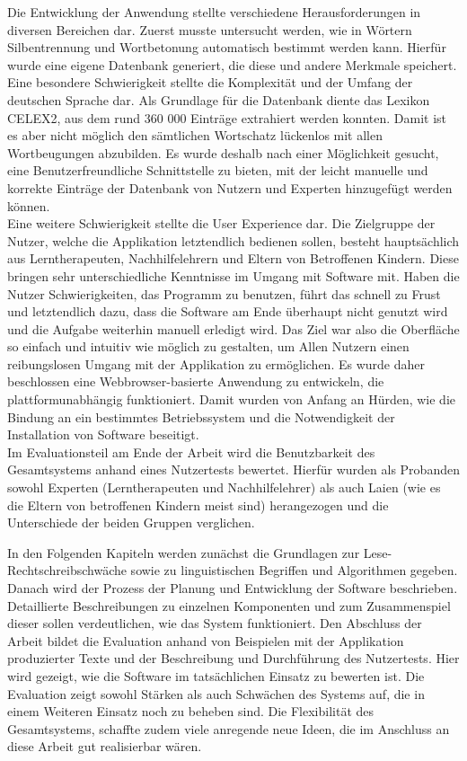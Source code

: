Die Entwicklung der Anwendung stellte verschiedene Herausforderungen in diversen Bereichen dar. Zuerst musste untersucht werden, wie in Wörtern Silbentrennung und Wortbetonung automatisch bestimmt werden kann. Hierfür wurde eine eigene Datenbank generiert, die diese und andere Merkmale speichert. Eine besondere Schwierigkeit stellte die Komplexität und der Umfang der deutschen Sprache dar. Als Grundlage für die Datenbank diente das Lexikon CELEX2, aus dem rund 360 000 Einträge extrahiert werden konnten. Damit ist es aber nicht möglich den sämtlichen Wortschatz lückenlos mit allen Wortbeugungen abzubilden. Es wurde deshalb nach einer Möglichkeit gesucht, eine Benutzerfreundliche Schnittstelle zu bieten, mit der leicht manuelle und korrekte Einträge der Datenbank von Nutzern und Experten hinzugefügt werden können.\\
Eine weitere Schwierigkeit stellte die User Experience dar. Die Zielgruppe der Nutzer, welche die Applikation letztendlich bedienen sollen, besteht hauptsächlich aus Lerntherapeuten, Nachhilfelehrern und Eltern von Betroffenen Kindern. Diese bringen sehr unterschiedliche Kenntnisse im Umgang mit Software mit. Haben die Nutzer Schwierigkeiten, das Programm zu benutzen, führt das schnell zu Frust und letztendlich dazu, dass die Software am Ende überhaupt nicht genutzt wird und die Aufgabe weiterhin manuell erledigt wird.  Das Ziel war also die Oberfläche so einfach und intuitiv wie möglich zu gestalten, um Allen Nutzern einen reibungslosen Umgang mit der Applikation zu ermöglichen. Es wurde daher beschlossen eine Webbrowser-basierte Anwendung zu entwickeln, die plattformunabhängig funktioniert. Damit wurden von Anfang an Hürden, wie die Bindung an ein bestimmtes Betriebssystem und die Notwendigkeit der Installation von Software beseitigt.\\
Im Evaluationsteil am Ende der Arbeit wird die Benutzbarkeit des Gesamtsystems anhand eines Nutzertests bewertet. Hierfür wurden als Probanden sowohl Experten (Lerntherapeuten und Nachhilfelehrer)  als auch Laien (wie es die Eltern von betroffenen Kindern meist sind) herangezogen und die Unterschiede der beiden Gruppen verglichen.

In den Folgenden Kapiteln werden zunächst die Grundlagen zur Lese-Rechtschreibschwäche sowie zu linguistischen Begriffen und Algorithmen gegeben. Danach wird der Prozess der Planung und Entwicklung der Software beschrieben. Detaillierte Beschreibungen zu einzelnen Komponenten und zum Zusammenspiel dieser sollen verdeutlichen, wie das System funktioniert. Den Abschluss der Arbeit bildet die Evaluation anhand von Beispielen mit der Applikation produzierter Texte und der Beschreibung und Durchführung des Nutzertests. Hier wird gezeigt, wie die Software im tatsächlichen Einsatz zu bewerten ist. Die Evaluation zeigt sowohl Stärken als auch Schwächen des Systems auf, die in einem Weiteren Einsatz noch zu beheben sind. Die Flexibilität des Gesamtsystems, schaffte zudem viele anregende neue Ideen, die im Anschluss an diese Arbeit gut realisierbar wären.